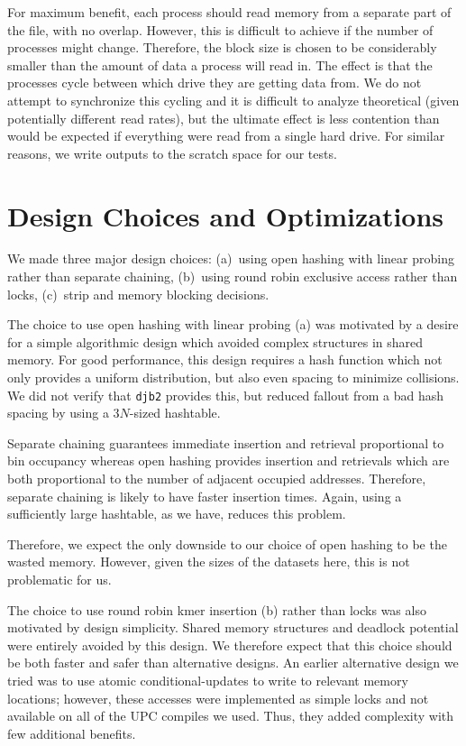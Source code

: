 \documentclass{article}
\begin{document}
For maximum benefit, each process should read memory from a separate part of the file, with no overlap. However, this is difficult to achieve if the number of processes might change. Therefore, the block size is chosen to be considerably smaller than the amount of data a process will read in. The effect is that the processes cycle between which drive they are getting data from. We do not attempt to synchronize this cycling and it is difficult to analyze theoretical (given potentially different read rates), but the ultimate effect is less contention than would be expected if everything were read from a single hard drive. For similar reasons, we write outputs to the scratch space for our tests.

\section{Design Choices and Optimizations}
We made three major design choices: (a)~using open hashing with linear probing rather than separate chaining, (b)~using round robin exclusive access rather than locks, (c)~strip and memory blocking decisions.

The choice to use open hashing with linear probing (a) was motivated by a desire for a simple algorithmic design which avoided complex structures in shared memory. For good performance, this design requires a hash function which not only provides a uniform distribution, but also even spacing to minimize collisions. We did not verify that \texttt{djb2} provides this, but reduced fallout from a bad hash spacing by using a $3N$-sized hashtable.

Separate chaining guarantees immediate insertion and retrieval proportional to bin occupancy whereas open hashing provides insertion and retrievals which are both proportional to the number of adjacent occupied addresses. Therefore, separate chaining is likely to have faster insertion times. Again, using a sufficiently large hashtable, as we have, reduces this problem.

Therefore, we expect the only downside to our choice of open hashing to be the wasted memory. However, given the sizes of the datasets here, this is not problematic for us.

The choice to use round robin kmer insertion (b) rather than locks was also motivated by design simplicity. Shared memory structures and deadlock potential were entirely avoided by this design. We therefore expect that this choice should be both faster and safer than alternative designs. An earlier alternative design we tried was to use atomic conditional-updates to write to relevant memory locations; however, these accesses were implemented as simple locks and not available on all of the UPC compiles we used. Thus, they added complexity with few additional benefits.
\end{document}
